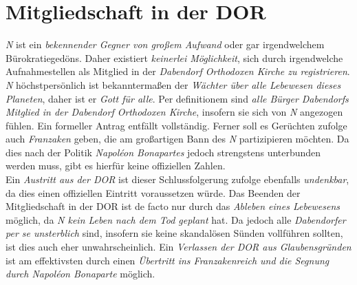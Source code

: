 \section{{Mitgliedschaft in der DOR}}
\textit{N} ist ein \textit{bekennender Gegner von großem Aufwand} oder gar irgendwelchem Bürokratiegedöns. Daher existiert \textit{keinerlei Möglichkeit}, sich durch irgendwelche Aufnahmestellen als Mitglied in der \textit{Dabendorf Orthodoxen Kirche zu registrieren}. \textit{N} höchstpersönlich ist bekanntermaßen der \textit{Wächter über alle Lebewesen dieses Planeten}, daher ist er \textit{Gott für alle}. Per definitionem sind \textit{alle Bürger Dabendorfs Mitglied in der Dabendorf Orthodoxen Kirche}, insofern sie sich von \textit{N} angezogen fühlen. Ein formeller Antrag entfällt vollständig. Ferner soll es Gerüchten zufolge auch \textit{Franzaken} geben, die am großartigen Bann des \textit{N} partizipieren möchten. Da dies nach der Politik \textit{Napoléon Bonapartes} jedoch strengstens unterbunden werden muss, gibt es hierfür keine offiziellen Zahlen.\\
Ein \textit{Austritt aus der DOR} ist dieser Schlussfolgerung zufolge ebenfalls \textit{undenkbar}, da dies einen offiziellen Eintritt voraussetzen würde. Das Beenden der Mitgliedschaft in der DOR ist de facto nur durch das \textit{Ableben eines Lebewesens} möglich, da \textit{N kein Leben nach dem Tod geplant} hat. Da jedoch alle \textit{Dabendorfer per se unsterblich} sind, insofern sie keine skandalösen Sünden vollführen sollten, ist dies auch eher unwahrscheinlich. Ein \textit{Verlassen der DOR aus Glaubensgründen} ist am effektivsten durch einen \textit{Übertritt ins Franzakenreich und die Segnung durch Napoléon Bonaparte} möglich.

